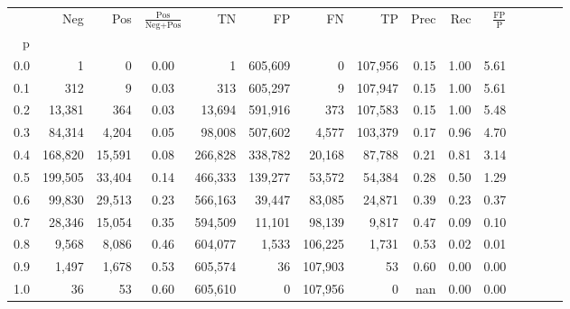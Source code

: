\begin{tabular}{rrrcrrrrrrrrrrr}
\toprule
{} &      Neg &     Pos & $\frac{\text{Pos}}{\text{Neg}+\text{Pos}}$ &       TN &       FP &       FN &       TP &  Prec &   Rec & $\frac{\text{FP}}{\text{P}}$ \\
p   &          &         &                                            &          &          &          &          &       &       &                              \\
\midrule
0.0 &        1 &       0 &                                       0.00 &        1 &  605,609 &        0 &  107,956 &  0.15 &  1.00 &                         5.61 \\
0.1 &      312 &       9 &                                       0.03 &      313 &  605,297 &        9 &  107,947 &  0.15 &  1.00 &                         5.61 \\
0.2 &   13,381 &     364 &                                       0.03 &   13,694 &  591,916 &      373 &  107,583 &  0.15 &  1.00 &                         5.48 \\
0.3 &   84,314 &   4,204 &                                       0.05 &   98,008 &  507,602 &    4,577 &  103,379 &  0.17 &  0.96 &                         4.70 \\
0.4 &  168,820 &  15,591 &                                       0.08 &  266,828 &  338,782 &   20,168 &   87,788 &  0.21 &  0.81 &                         3.14 \\
0.5 &  199,505 &  33,404 &                                       0.14 &  466,333 &  139,277 &   53,572 &   54,384 &  0.28 &  0.50 &                         1.29 \\
0.6 &   99,830 &  29,513 &                                       0.23 &  566,163 &   39,447 &   83,085 &   24,871 &  0.39 &  0.23 &                         0.37 \\
0.7 &   28,346 &  15,054 &                                       0.35 &  594,509 &   11,101 &   98,139 &    9,817 &  0.47 &  0.09 &                         0.10 \\
0.8 &    9,568 &   8,086 &                                       0.46 &  604,077 &    1,533 &  106,225 &    1,731 &  0.53 &  0.02 &                         0.01 \\
0.9 &    1,497 &   1,678 &                                       0.53 &  605,574 &       36 &  107,903 &       53 &  0.60 &  0.00 &                         0.00 \\
1.0 &       36 &      53 &                                       0.60 &  605,610 &        0 &  107,956 &        0 &   nan &  0.00 &                         0.00 \\
\bottomrule
\end{tabular}
